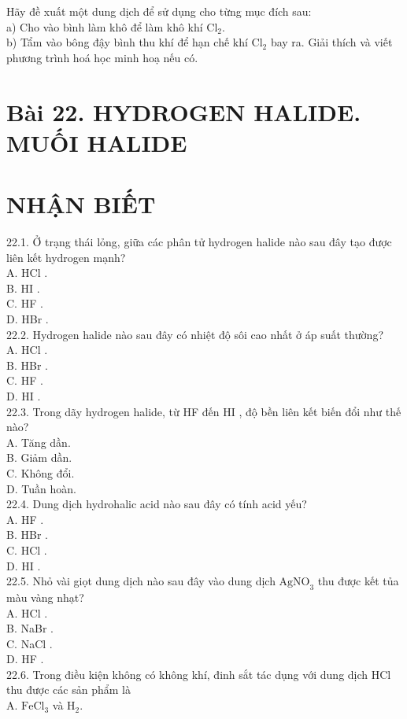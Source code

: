 \documentclass[10pt]{article}
\begin{document}
Hãy đề xuất một dung dịch để sử dụng cho từng mục đích sau:\\
a) Cho vào bình làm khô để làm khô khí $\mathrm{Cl}_{2}$.\\
b) Tẩm vào bông đậy bình thu khí để hạn chế khí $\mathrm{Cl}_{2}$ bay ra. Giải thích và viết phương trình hoá học minh hoạ nếu có.

\section*{Bài 22. HYDROGEN HALIDE. MUỐI HALIDE}
\section*{NHẬN BIẾT}
22.1. Ở trạng thái lỏng, giữa các phân tử hydrogen halide nào sau đây tạo được liên kết hydrogen mạnh?\\
A. HCl .\\
B. HI .\\
C. HF .\\
D. HBr .\\
22.2. Hydrogen halide nào sau đây có nhiệt độ sôi cao nhất ở áp suất thường?\\
A. HCl .\\
B. HBr .\\
C. HF .\\
D. HI .\\
22.3. Trong dãy hydrogen halide, từ HF đến HI , độ bền liên kết biến đổi như thế nào?\\
A. Tăng dần.\\
B. Giảm dần.\\
C. Không đổi.\\
D. Tuần hoàn.\\
22.4. Dung dịch hydrohalic acid nào sau đây có tính acid yếu?\\
A. HF .\\
B. HBr .\\
C. HCl .\\
D. HI .\\
22.5. Nhỏ vài giọt dung dịch nào sau đây vào dung dịch $\mathrm{AgNO}_{3}$ thu được kết tủa màu vàng nhạt?\\
A. HCl .\\
B. NaBr .\\
C. NaCl .\\
D. HF .\\
22.6. Trong điều kiện không có không khí, đinh sắt tác dụng với dung dịch HCl thu được các sản phẩm là\\
A. $\mathrm{FeCl}_{3}$ và $\mathrm{H}_{2}$.\\
\end{document}
